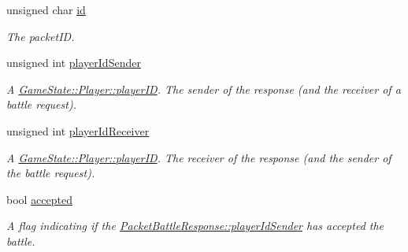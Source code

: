 \begin{DoxyCompactItemize}
\item 
\hypertarget{struct_packet_battle_response_ac70feabfe2e6f94c88c72734825c9ba3}{unsigned char \hyperlink{struct_packet_battle_response_ac70feabfe2e6f94c88c72734825c9ba3}{id}}\label{struct_packet_battle_response_ac70feabfe2e6f94c88c72734825c9ba3}

\begin{DoxyCompactList}\small\item\em The packet\-I\-D. \end{DoxyCompactList}\item 
\hypertarget{struct_packet_battle_response_a160a7d9a9d83a0aa30799e0e625cb585}{unsigned int \hyperlink{struct_packet_battle_response_a160a7d9a9d83a0aa30799e0e625cb585}{player\-Id\-Sender}}\label{struct_packet_battle_response_a160a7d9a9d83a0aa30799e0e625cb585}

\begin{DoxyCompactList}\small\item\em A \hyperlink{class_game_state_1_1_player_acbd28d89e6eb8611aa66452ec31e9133}{Game\-State\-::\-Player\-::player\-I\-D}. The sender of the response (and the receiver of a battle request). \end{DoxyCompactList}\item 
\hypertarget{struct_packet_battle_response_a6060ede7257820987a0d8b086a3d205f}{unsigned int \hyperlink{struct_packet_battle_response_a6060ede7257820987a0d8b086a3d205f}{player\-Id\-Receiver}}\label{struct_packet_battle_response_a6060ede7257820987a0d8b086a3d205f}

\begin{DoxyCompactList}\small\item\em A \hyperlink{class_game_state_1_1_player_acbd28d89e6eb8611aa66452ec31e9133}{Game\-State\-::\-Player\-::player\-I\-D}. The receiver of the response (and the sender of the battle request). \end{DoxyCompactList}\item 
\hypertarget{struct_packet_battle_response_a58d1d3efb9c0be580bb6676b7262fdd9}{bool \hyperlink{struct_packet_battle_response_a58d1d3efb9c0be580bb6676b7262fdd9}{accepted}}\label{struct_packet_battle_response_a58d1d3efb9c0be580bb6676b7262fdd9}

\begin{DoxyCompactList}\small\item\em A flag indicating if the \hyperlink{struct_packet_battle_response_a160a7d9a9d83a0aa30799e0e625cb585}{Packet\-Battle\-Response\-::player\-Id\-Sender} has accepted the battle. \end{DoxyCompactList}\end{DoxyCompactItemize}


